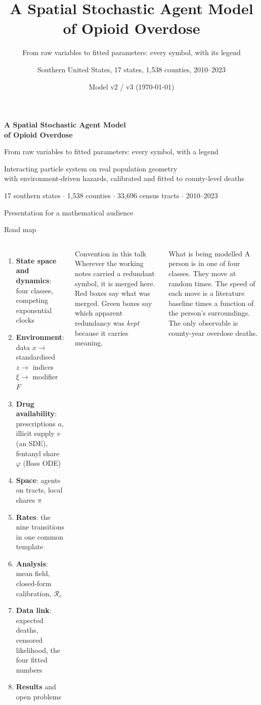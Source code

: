 ﻿\documentclass[9pt,aspectratio=169]{beamer}
\title{A Spatial Stochastic Agent Model of Opioid Overdose}
\subtitle{From raw variables to fitted parameters: every symbol, with its legend}
\author{Southern United States, 17 states, 1{,}538 counties, 2010--2023}
\date{Model v2 / v3 \quad(\today)}
\newcommand{\Rzero}{\mathcal R_c}
\begin{document}
\begin{frame}[plain]
 \vspace{1.2cm}
 {\color{accent}\Huge\bfseries A Spatial Stochastic Agent Model\\[2pt] of Opioid Overdose\par}
 \vspace{4pt}
 {\Large From raw variables to fitted parameters: every symbol, with a legend\par}
 \vspace{1.0cm}
 {\large Interacting particle system on real population geometry\\
 with environment-driven hazards, calibrated and fitted to county-level deaths\par}
 \vspace{1.0cm}
 {\small 17 southern states $\cdot$ 1{,}538 counties $\cdot$ 33{,}696 census tracts $\cdot$ 2010--2023\par}
 {\small Presentation for a mathematical audience}
\end{frame}

\begin{frame}{Road map}
 \begin{columns}[T]
 \begin{enumerate}\setlength\itemsep{3pt}
  \item \textbf{State space and dynamics}: four classes, competing exponential clocks
  \item \textbf{Environment}: data $x\to$ standardised $z\to$ indices $\xi\to$ modifier $F$
  \item \textbf{Drug availability}: prescriptions $a$, illicit supply $v$ (an SDE), fentanyl share $\varphi$ (Bass ODE)
  \item \textbf{Space}: agents on tracts, local shares $\pi$
  \item \textbf{Rates}: the nine transitions in one common template
  \item \textbf{Analysis}: mean field, closed-form calibration, $\Rzero$
  \item \textbf{Data link}: expected deaths, censored likelihood, the four fitted numbers
  \item \textbf{Results} and open problems
 \end{enumerate}
 \begin{alertblock}{Convention in this talk}\small
  Wherever the working notes carried a redundant symbol, it is merged here. Red boxes say what was merged. Green boxes say which apparent redundancy was \emph{kept} because it carries meaning.
 \end{alertblock}
 \begin{block}{What is being modelled}\small
  A person is in one of four classes. They move at random times. The speed of each move is a literature baseline times a function of the person's surroundings. The only observable is county-year overdose deaths.
 \end{block}
 \end{columns}
\end{frame}
\end{document}
